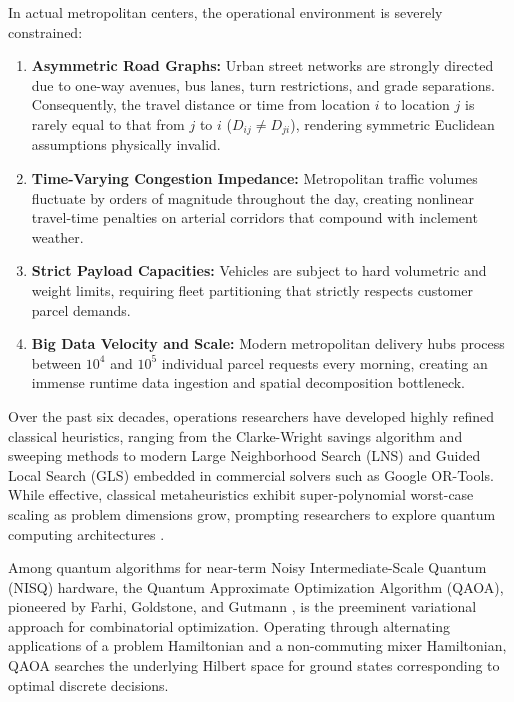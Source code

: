 \documentclass[journal,10pt]{IEEEtran}
\begin{document}
In actual metropolitan centers, the operational environment is severely constrained:
\begin{enumerate}
    \item \textbf{Asymmetric Road Graphs:} Urban street networks are strongly directed due to one-way avenues, bus lanes, turn restrictions, and grade separations. Consequently, the travel distance or time from location $i$ to location $j$ is rarely equal to that from $j$ to $i$ ($D_{ij} \ne D_{ji}$), rendering symmetric Euclidean assumptions physically invalid.
    \item \textbf{Time-Varying Congestion Impedance:} Metropolitan traffic volumes fluctuate by orders of magnitude throughout the day, creating nonlinear travel-time penalties on arterial corridors that compound with inclement weather.
    \item \textbf{Strict Payload Capacities:} Vehicles are subject to hard volumetric and weight limits, requiring fleet partitioning that strictly respects customer parcel demands.
    \item \textbf{Big Data Velocity and Scale:} Modern metropolitan delivery hubs process between $10^4$ and $10^5$ individual parcel requests every morning, creating an immense runtime data ingestion and spatial decomposition bottleneck.
\end{enumerate}

Over the past six decades, operations researchers have developed highly refined classical heuristics, ranging from the Clarke-Wright savings algorithm \cite{clarke1964scheduling} and sweeping methods to modern Large Neighborhood Search (LNS) and Guided Local Search (GLS) \cite{toth2014vehicle} embedded in commercial solvers such as Google OR-Tools. While effective, classical metaheuristics exhibit super-polynomial worst-case scaling as problem dimensions grow, prompting researchers to explore quantum computing architectures \cite{preskill2018quantum}.

Among quantum algorithms for near-term Noisy Intermediate-Scale Quantum (NISQ) hardware, the Quantum Approximate Optimization Algorithm (QAOA), pioneered by Farhi, Goldstone, and Gutmann \cite{farhi2014qaoa}, is the preeminent variational approach for combinatorial optimization. Operating through alternating applications of a problem Hamiltonian and a non-commuting mixer Hamiltonian, QAOA searches the underlying Hilbert space for ground states corresponding to optimal discrete decisions.
\end{document}
